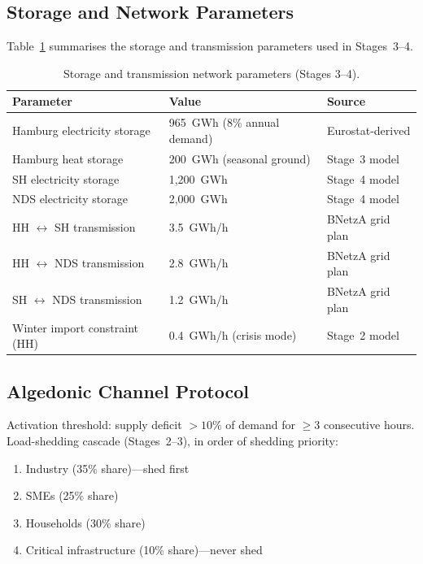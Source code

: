\documentclass[12pt]{article}
\begin{document}
\subsection{Storage and Network Parameters}

Table~\ref{tab:storage} summarises the storage and transmission parameters used in
Stages~3--4.

\begin{table}[H]
  \centering
  \caption{Storage and transmission network parameters (Stages 3--4).}
  \label{tab:storage}
  \begin{tabular}{p{5.5cm} p{4.5cm} p{3.5cm}}
    \toprule
    \textbf{Parameter} & \textbf{Value} & \textbf{Source} \\
    \midrule
    Hamburg electricity storage  & 965~GWh (8\% annual demand) & Eurostat-derived \\
    Hamburg heat storage         & 200~GWh (seasonal ground)   & Stage~3 model \\
    SH electricity storage       & 1{,}200~GWh                 & Stage~4 model \\
    NDS electricity storage      & 2{,}000~GWh                 & Stage~4 model \\
    HH $\leftrightarrow$ SH transmission & 3.5~GWh/h           & BNetzA grid plan \\
    HH $\leftrightarrow$ NDS transmission & 2.8~GWh/h          & BNetzA grid plan \\
    SH $\leftrightarrow$ NDS transmission & 1.2~GWh/h          & BNetzA grid plan \\
    Winter import constraint (HH) & 0.4~GWh/h (crisis mode)    & Stage~2 model \\
    \bottomrule
  \end{tabular}
\end{table}

\subsection{Algedonic Channel Protocol}

Activation threshold: supply deficit $> 10\%$ of demand for $\geq 3$ consecutive hours.
Load-shedding cascade (Stages~2--3), in order of shedding priority:

\begin{enumerate}
  \item Industry (35\% share)---shed first
  \item SMEs (25\% share)
  \item Households (30\% share)
  \item Critical infrastructure (10\% share)---never shed
\end{enumerate}
\end{document}
